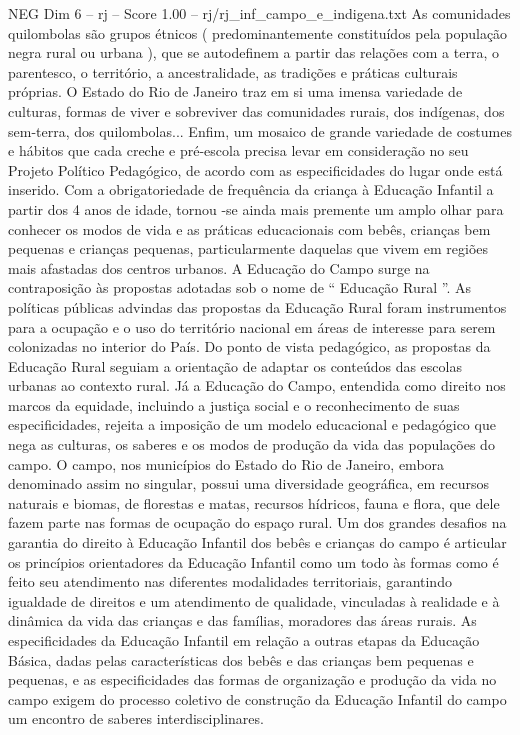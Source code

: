 \begin{textsample}{NEG Dim 6 – rj – Score 1.00 – rj/rj\_inf\_campo\_e\_indigena.txt}
As comunidades quilombolas são grupos étnicos ( predominantemente constituídos pela população negra rural ou urbana ), que se autodefinem a partir das relações com a terra, o parentesco, o território, a ancestralidade, as tradições e práticas culturais próprias.
O Estado do Rio de Janeiro traz em si uma imensa variedade de culturas, formas de viver e sobreviver das comunidades rurais, dos indígenas, dos sem-terra, dos quilombolas...
Enfim, um mosaico de grande variedade de costumes e hábitos que cada creche e pré-escola precisa levar em consideração no seu Projeto Político Pedagógico, de acordo com as especificidades do lugar onde está inserido.
Com a obrigatoriedade de frequência da criança à Educação Infantil a partir dos 4 anos de idade, tornou -se ainda mais premente um amplo olhar para conhecer os modos de vida e as práticas educacionais com bebês, crianças bem pequenas e crianças pequenas, particularmente daquelas que vivem em regiões mais afastadas dos centros urbanos.
A Educação do Campo surge na contraposição às propostas adotadas sob o nome de “ Educação Rural ”.
As políticas públicas advindas das propostas da Educação Rural foram instrumentos para a ocupação e o uso do território nacional em áreas de interesse para serem colonizadas no interior do País.
Do ponto de vista pedagógico, as propostas da Educação Rural seguiam a orientação de adaptar os conteúdos das escolas urbanas ao contexto rural.
Já a Educação do Campo, entendida como direito nos marcos da equidade, incluindo a justiça social e o reconhecimento de suas especificidades, rejeita a imposição de um modelo educacional e pedagógico que nega as culturas, os saberes e os modos de produção da vida das populações do campo.
O campo, nos municípios do Estado do Rio de Janeiro, embora denominado assim no singular, possui uma diversidade geográfica, em recursos naturais e biomas, de florestas e matas, recursos hídricos, fauna e flora, que dele fazem parte nas formas de ocupação do espaço rural.
Um dos grandes desafios na garantia do direito à Educação Infantil dos bebês e crianças do campo é articular os princípios orientadores da Educação Infantil como um todo às formas como é feito seu atendimento nas diferentes modalidades territoriais, garantindo igualdade de direitos e um atendimento de qualidade, vinculadas à realidade e à dinâmica da vida das crianças e das famílias, moradores das áreas rurais.
As especificidades da Educação Infantil em relação a outras etapas da Educação Básica, dadas pelas características dos bebês e das crianças bem pequenas e pequenas, e as especificidades das formas de organização e produção da vida no campo exigem do processo coletivo de construção da Educação Infantil do campo um encontro de saberes interdisciplinares.

\end{textsample}
